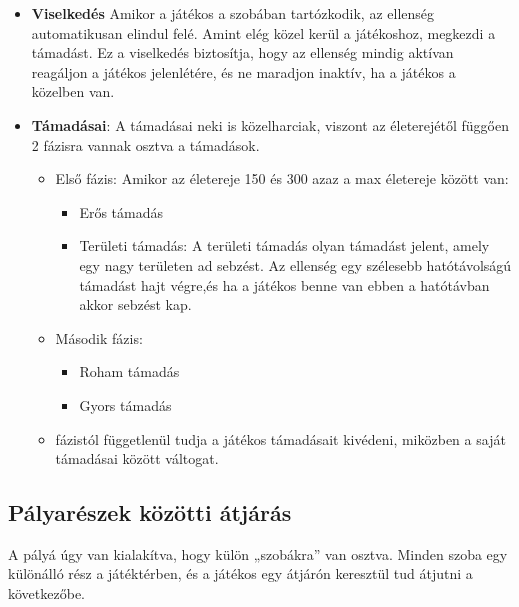 \documentclass[
]{thesis-ekf}
\theoremstyle{definition}
\theoremstyle{remark}
\begin{document}
\begin{itemize}
\begin{itemize}
		\item \textbf{Viselkedés} Amikor a játékos a szobában tartózkodik, az ellenség automatikusan elindul felé. Amint elég közel kerül a játékoshoz, megkezdi a támadást. Ez a viselkedés biztosítja, hogy az ellenség mindig aktívan reagáljon a játékos jelenlétére, és ne maradjon inaktív, ha a játékos a közelben van.
		\item \textbf{Támadásai}: A támadásai neki is közelharciak, viszont az életerejétől függően 2 fázisra vannak osztva a támadások.
		\begin{itemize}
			\item Első fázis: Amikor az életereje 150 és 300 azaz a max életereje között van:
			\begin{itemize}
				\item Erős támadás
				\item Területi támadás: A területi támadás olyan támadást jelent, amely egy nagy területen ad sebzést. Az ellenség egy szélesebb hatótávolságú támadást hajt végre,és ha a játékos benne van ebben a hatótávban akkor sebzést kap.
			\end{itemize}
			\item Második fázis:
			\begin{itemize}
				\item Roham támadás
				\item Gyors támadás
			\end{itemize}
			\item fázistól függetlenül tudja a játékos támadásait kivédeni, miközben a saját támadásai között váltogat.
		\end{itemize}
	\end{itemize}
\end{itemize}

\subsection{Pályarészek közötti átjárás}
A pályá úgy van kialakítva, hogy külön „szobákra” van osztva. Minden szoba egy különálló rész a játéktérben, és a játékos egy átjárón keresztül tud átjutni a következőbe.
\end{document}
